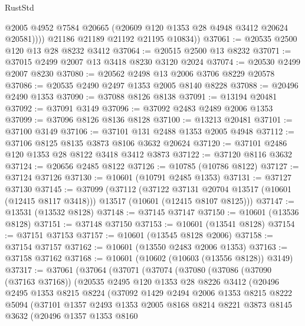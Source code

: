 \begin{lexlean}{RustStd}
\begin{coremodule}
              @2005
              @4952
              @7584
              @20665
              (@20609 @120 @1353 @28 @4948 @3412 @20624 @20581))))
        @21186
        @21189
        @21192
        @21195
        @10834))
@37061 := @20535 @2500 @120 @13 @28 @8232 @3412
@37064 := @20515 @2500 @13 @8232
@37071 := @37015 @2499 @2007 @13 @3418 @8230 @3120 @2024
@37074 := @20530 @2499 @2007 @8230
@37080 := @20562 @2498 @13 @2006 @3706 @8229 @20578
@37086 := @20535 @2490 @2497 @1353 @2005 @8140 @8228
@37088 := @20496 @2490 @1353
@37090 := @37088 @8126 @8138
@37091 := @13194 @20481
@37092 := @37091 @3149
@37096 := @37092 @2483 @2489 @2006 @1353
@37099 := @37096 @8126 @8136 @8128
@37100 := @13213 @20481
@37101 := @37100 @3149
@37106 := @37101 @131 @2488 @1353 @2005 @4948
@37112 := @37106 @8125 @8135 @3873 @8106 @3632 @20624
@37120 := @37101 @2486 @120 @1353 @28 @8122 @3418 @3412 @3873
@37122 := @37120 @8116 @3632
@37124 := @20656 @2485 @8122
@37126 := @10785 (@10786 @8122)
@37127 := @37124 @37126
@37130 := @10601 (@10791 @2485 @1353)
@37131 := @37127 @37130
@37145 := @37099
    (@37112
      (@37122 @37131 @20704 @13517 (@10601 (@12415 @8117 @3418)))
      @13517
      (@10601 (@12415 @8107 @8125)))
@37147 := @13531 (@13532 @8128)
@37148 := @37145 @37147
@37150 := @10601 (@13536 @8128)
@37151 := @37148 @37150
@37153 := @10601 (@13541 @8128)
@37154 := @37151 @37153
@37157 := @10601 (@13545 @8128 @2006)
@37158 := @37154 @37157
@37162 := @10601 (@13550 @2483 @2006 @1353)
@37163 := @37158 @37162
@37168 := @10601 (@10602 (@10603 (@13556 @8128)) @3149)
@37317 := @37061
    (@37064
      (@37071
        (@37074
          (@37080
            (@37086
              (@37090 (@37163 @37168))
              (@20535
                @2495
                @120
                @1353
                @28
                @8226
                @3412
                (@20496
                  @2495
                  @1353
                  @8215
                  @8224
                  (@37092
                    @1429
                    @2494
                    @2006
                    @1353
                    @8215
                    @8222
                    @5094
                    (@37101
                      @1357
                      @2493
                      @1353
                      @2005
                      @8168
                      @8214
                      @8221
                      @3873
                      @8145
                      @3632
                      (@20496
                        @1357
                        @1353
                        @8160

\end{coremodule}
\end{lexlean}
